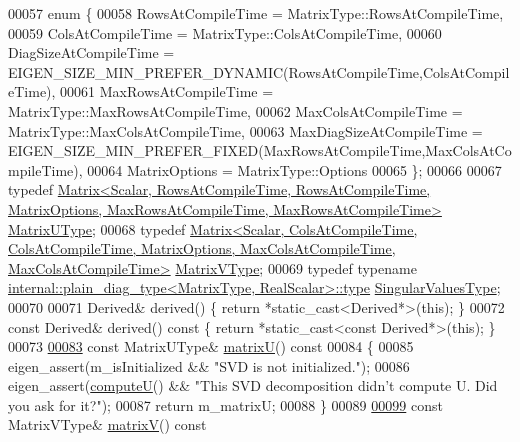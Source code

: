\begin{DoxyCode}
00057   \textcolor{keyword}{enum} \{
00058     RowsAtCompileTime = MatrixType::RowsAtCompileTime,
00059     ColsAtCompileTime = MatrixType::ColsAtCompileTime,
00060     DiagSizeAtCompileTime = EIGEN\_SIZE\_MIN\_PREFER\_DYNAMIC(RowsAtCompileTime,ColsAtCompileTime),
00061     MaxRowsAtCompileTime = MatrixType::MaxRowsAtCompileTime,
00062     MaxColsAtCompileTime = MatrixType::MaxColsAtCompileTime,
00063     MaxDiagSizeAtCompileTime = EIGEN\_SIZE\_MIN\_PREFER\_FIXED(MaxRowsAtCompileTime,MaxColsAtCompileTime),
00064     MatrixOptions = MatrixType::Options
00065   \};
00066 
00067   \textcolor{keyword}{typedef} 
      \hyperlink{group___core___module}{Matrix<Scalar, RowsAtCompileTime, RowsAtCompileTime, MatrixOptions, MaxRowsAtCompileTime,
       MaxRowsAtCompileTime>}
       \hyperlink{group___core___module}{MatrixUType};
00068   \textcolor{keyword}{typedef} 
      \hyperlink{group___core___module}{Matrix<Scalar, ColsAtCompileTime, ColsAtCompileTime, MatrixOptions, MaxColsAtCompileTime,
       MaxColsAtCompileTime>}
       \hyperlink{group___core___module}{MatrixVType};
00069   \textcolor{keyword}{typedef} \textcolor{keyword}{typename} \hyperlink{class_eigen_1_1internal_1_1_tensor_lazy_evaluator_writable}{internal::plain\_diag\_type<MatrixType, RealScalar>::type}
       \hyperlink{class_eigen_1_1internal_1_1_tensor_lazy_evaluator_writable}{SingularValuesType};
00070   
00071   Derived& derived() \{ \textcolor{keywordflow}{return} *\textcolor{keyword}{static\_cast<}Derived*\textcolor{keyword}{>}(\textcolor{keyword}{this}); \}
00072   \textcolor{keyword}{const} Derived& derived()\textcolor{keyword}{ const }\{ \textcolor{keywordflow}{return} *\textcolor{keyword}{static\_cast<}\textcolor{keyword}{const }Derived*\textcolor{keyword}{>}(\textcolor{keyword}{this}); \}
00073 
\hyperlink{group___s_v_d___module_afc7fe1546b0f6e1801b86f22f5664cb8}{00083}   \textcolor{keyword}{const} MatrixUType& \hyperlink{group___s_v_d___module_afc7fe1546b0f6e1801b86f22f5664cb8}{matrixU}()\textcolor{keyword}{ const}
00084 \textcolor{keyword}{  }\{
00085     eigen\_assert(m\_isInitialized && \textcolor{stringliteral}{"SVD is not initialized."});
00086     eigen\_assert(\hyperlink{group___s_v_d___module_a705a7c2709e1624ccc19aa748a78d473}{computeU}() && \textcolor{stringliteral}{"This SVD decomposition didn't compute U. Did you ask for it?"});
00087     \textcolor{keywordflow}{return} m\_matrixU;
00088   \}
00089 
\hyperlink{group___s_v_d___module_a245a453b5e7347f737295c23133238c4}{00099}   \textcolor{keyword}{const} MatrixVType& \hyperlink{group___s_v_d___module_a245a453b5e7347f737295c23133238c4}{matrixV}()\textcolor{keyword}{ const}

\end{DoxyCode}

